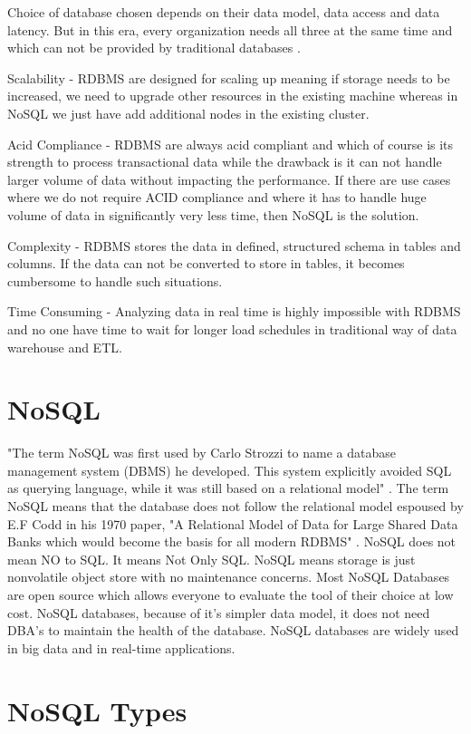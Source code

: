 \documentclass[sigconf]{acmart}
\begin{document}
Choice of database chosen depends on their data model, data access and data latency. But in this era, every organization needs all three at the same time and which can not be provided by traditional databases \cite{vish}.

Scalability - RDBMS are designed for scaling up meaning if storage needs to be increased, we need to upgrade other resources in the existing machine whereas in NoSQL we just have add additional nodes in the existing cluster. 

Acid Compliance - RDBMS are always acid compliant and which of course is its strength to process transactional data while the drawback is it can not handle larger volume of data without impacting the performance. If there are use cases where we do not require ACID compliance and  where it has to handle huge volume of data in significantly very less time, then NoSQL is the solution.

Complexity - RDBMS stores the data in defined, structured schema in tables and columns. If the data can not be converted to store in tables, it becomes cumbersome to handle such situations. 

Time Consuming - Analyzing data in real time is highly impossible with RDBMS and no one have time to wait for longer load schedules in traditional way of data warehouse and ETL.

\section{NoSQL}

"The term NoSQL was first used by Carlo Strozzi to name a database management system (DBMS) he developed. This system explicitly avoided SQL as querying language, while it was still based on a relational model" \cite{seasupenn}. The term NoSQL means that the database does not follow the relational model espoused by E.F Codd in his 1970 paper, "A Relational Model of Data for Large Shared Data Banks which would become the basis for all modern RDBMS" \cite{rdbms}. NoSQL does not mean NO to SQL. It means Not Only SQL. NoSQL means storage is just nonvolatile object store with no maintenance concerns. Most NoSQL Databases are open source which allows everyone to evaluate the tool of their choice at low cost. NoSQL databases, because of it's simpler data model, it does not need DBA's to maintain the health of the database. NoSQL databases are widely used in big data and in real-time applications.  

\section{NoSQL Types}
\end{document}
